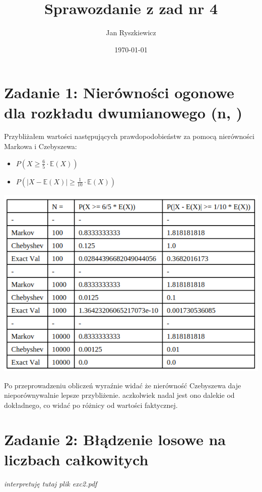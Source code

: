 \documentclass{article}
\title{Sprawozdanie z zad nr 4}
\author{Jan Ryszkiewicz}
\date{\today}
\begin{document}
\maketitle

\section*{Zadanie 1: Nierówności ogonowe dla rozkładu dwumianowego \left(n, \right)}

Przybliżałem wartości następujących prawdopodobieństw za pomocą nierówności Markowa i Czebyszewa:
\begin{itemize}
    \item \( P\left(X \geq \frac{6}{5} \cdot \mathbb{E}(X)\right) \)
    \item \( P\left( \left| X - \mathbb{E}(X) \right| \geq \frac{1}{10} \cdot \mathbb{E}(X) \right) \)
\end{itemize}

\hspace*{-0cm} \includegraphics[scale=0.5]{./plots/exc1.png}

Po przeprowadzeniu obliczeń wyraźnie widać że nierówność Czebyszewa daje nieporównywalnie lepsze przybliżenie.
aczkolwiek nadal jest ono dalekie od dokładnego, co widać po różnicy od wartości faktycznej. \\

\section*{Zadanie 2: Błądzenie losowe na liczbach całkowitych}

\textit{interpretuję tutaj plik exc2.pdf}
\end{document}
